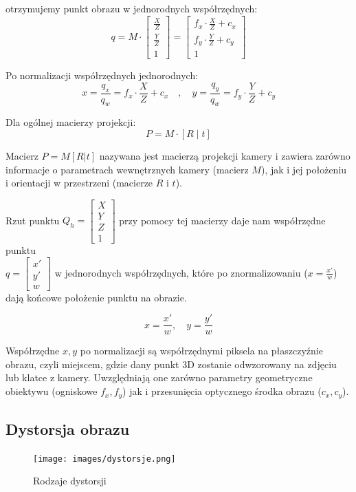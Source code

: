 \documentclass[magisterska]{pracadypl}
\begin{document}
otrzymujemy punkt obrazu w jednorodnych współrzędnych:
\[
q = M \cdot \begin{bmatrix}
\frac{X}{Z} \\
\frac{Y}{Z} \\
1
\end{bmatrix}
=
\begin{bmatrix}
f_x \cdot \frac{X}{Z} + c_x \\
f_y \cdot \frac{Y}{Z} + c_y \\
1
\end{bmatrix}
\]

Po normalizacji współrzędnych jednorodnych:
\[
x = \frac{q_x}{q_w} = f_x \cdot \frac{X}{Z} + c_x
\quad , \quad
y = \frac{q_y}{q_w} = f_y \cdot \frac{Y}{Z} + c_y
\]

Dla ogólnej macierzy projekcji:
\[
P = M \cdot [R \;|\; t]
\]

Macierz \( P = M[R | t] \) nazywana jest macierzą projekcji kamery i zawiera zarówno informacje o parametrach wewnętrznych kamery (macierz \( M \)), jak i jej położeniu i orientacji w przestrzeni (macierze \( R \) i \( t \)).

Rzut punktu \( Q_h = \begin{bmatrix} X \\ Y \\ Z \\ 1 \end{bmatrix} \) przy pomocy tej macierzy daje nam współrzędne punktu\\ \( q = \begin{bmatrix} x' \\ y' \\ w \end{bmatrix} \) w jednorodnych współrzędnych, które po znormalizowaniu (\( x = \frac{x'}{w} \)) dają końcowe położenie punktu na obrazie.

\[
x = \frac{x'}{w}, \quad y = \frac{y'}{w}
\]

Współrzędne \( x, y \) po normalizacji są współrzędnymi piksela na płaszczyźnie obrazu, czyli miejscem, gdzie dany punkt 3D zostanie odwzorowany na zdjęciu lub klatce z kamery. Uwzględniają one zarówno parametry geometryczne obiektywu (ogniskowe \( f_x, f_y \)) jak i przesunięcia optycznego środka obrazu (\( c_x, c_y \)).

\subsection{Dystorsja obrazu}

\begin{figure}[H]  %
    \centering  %
    \texttt{[image: images/dystorsje.png]}  %
    \captionsetup{font=footnotesize}
    \caption[Rodzaje dystorsji. https://beafoto.pl/dystorsja]{Rodzaje dystorsji}
    \label{fig:rpi}  %
\end{figure}
\end{document}
